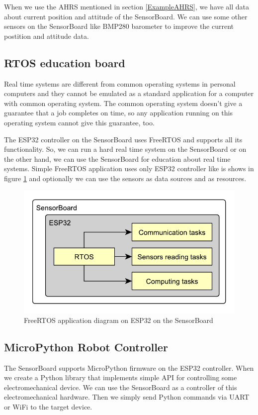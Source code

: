 When we use the AHRS mentioned in section \ref{ExampleAHRS}, we have all data about current position and attitude of the SensorBoard. We can use some other sensors on the SensorBoard like BMP280 barometer \cite{bosch:BMP280} to improve the current postition and attitude data.

\subsection{RTOS education board}
Real time systems are different from common operating systems in personal computers and they cannot be emulated as a standard application for a computer with common operating system. The common operating system doesn't give a guarantee that a job completes on time, so any application running on this operating system cannot give this guarantee, too.

The ESP32 controller on the SensorBoard uses FreeRTOS and supports all its functionality. \cite{ESP32FreeRTOS} So, we can run a hard real time system on the SensorBoard or on the other hand, we can use the SensorBoard for education about real time systems. Simple FreeRTOS application uses only ESP32 controller like is shows in figure \ref{UEFreeRTOS} and optionally we can use the sensors as data sources and as resources.

\begin{figure}[H]
	\centering
	\label{UEFreeRTOS}
	\caption{FreeRTOS application diagram on ESP32 on the SensorBoard}
	\includegraphics[scale=1]{img/UsageExamplesRTOS.pdf}
\end{figure}

\subsection{MicroPython Robot Controller}
The SensorBoard supports MicroPython firmware \cite{MicroPython} on the ESP32 controller. When we create a Python library that implements simple API for controlling some electromechanical device. We can use the SensorBoard as a controller of this electromechanical hardware. Then we simply send Python commands via UART or WiFi to the target device.

